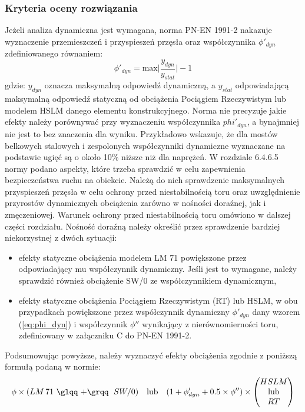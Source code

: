 \subsubsection{Kryteria oceny rozwiązania} \label{sect: eurokod_kryteria_oceny}
Jeżeli analiza dynamiczna jest wymagana, norma PN-EN 1991-2 nakazuje wyznaczenie przemieszczeń i przyspieszeń przęsła oraz współczynnika $\phi'_{dyn}$ zdefiniowanego równaniem:
\begin{equation} \label{eq:phi_dyn}
	\phi '_{dyn} = \text{max}\Big| \frac{y_{dyn}}{y_{stat}} \Big| -1
\end{equation}
gdzie: $y_{dyn}$ oznacza maksymalną odpowiedź dynamiczną, a $y_{stat}$ odpowiadającą maksymalną odpowiedź statyczną od obciążenia Pociągiem Rzeczywistym lub modelem HSLM danego elementu konstrukcyjnego. Norma nie precyzuje jakie efekty należy porównywać przy wyznaczeniu współczynnika $phi '_{dyn}$, a bynajmniej nie jest to bez znaczenia dla wyniku. Przykładowo \cite{Klasztorny2005} wskazuje, że dla mostów belkowych stalowych i zespolonych współczynniki dynamiczne wyznaczane na podstawie ugięć są o około 10\% niższe niż dla naprężeń. W rozdziale 6.4.6.5 normy podano aspekty, które trzeba sprawdzić w celu zapewnienia bezpieczeństwa ruchu na obiekcie. Należą do nich sprawdzenie maksymalnych przyspieszeń przęsła w celu ochrony przed niestabilnością toru oraz uwzględnienie przyrostów dynamicznych obciążenia zarówno w nośności doraźnej, jak i zmęczeniowej.
Warunek ochrony przed niestabilnością toru omówiono w dalszej części rozdziału. Nośność doraźną należy określić przez sprawdzenie bardziej niekorzystnej z dwóch sytuacji:
\begin{itemize}
	\item efekty statyczne obciążenia modelem LM 71 powiększone przez odpowiadający mu współczynnik dynamiczny. Jeśli jest to wymagane, należy sprawdzić również obciążenie SW/0 ze współczynnikiem dynamicznym,
	\item efekty statyczne obciążenia Pociągiem Rzeczywistym (RT) lub HSLM, w obu przypadkach powiększone przez współczynnik dynamiczny $\phi '_{dyn}$ dany wzorem (\ref{eq:phi_dyn}) i współczynnik $\phi''$ wynikający z nierównomierności toru, zdefiniowany w załączniku C do PN-EN 1991-2.
\end{itemize}
Podsumowując powyższe, należy wyznaczyć efekty obciążenia zgodnie z poniższą formułą podaną w normie:
\begin{equation} \label{eq:SGN_dyna}
	\phi \times (LM\,71 \text{ \glqq +\grqq }\; SW/0)\quad \text{lub} \quad
	(1+\phi '_{dyn}+0.5 \times \phi'') \times 
	\begin{pmatrix}
		HSLM \\
		\text{lub} \\
		RT
	\end{pmatrix}
\end{equation}

